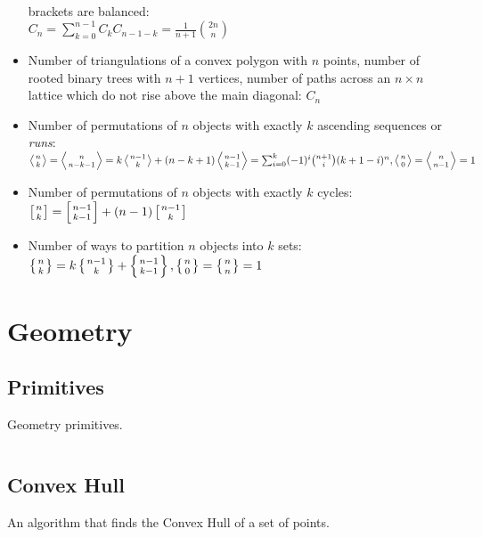 \documentclass[8pt,a4paper]{amsart}
\newcommand{\code}[1]{\inputminted[linenos]{cpp}{_code/#1}}
\begin{document}
\begin{itemize}
                brackets are balanced: \\ $C_n = \sum_{k=0}^{n-1} C_kC_{n-1-k}
                = \frac{1}{n+1}\binom{2n}n$
            \item Number of triangulations of a convex polygon with $n$ points,
                number of rooted binary trees with $n+1$ vertices, number of
                paths across an $n\times n$ lattice which do not rise above the
                main diagonal: $C_n$
            \item Number of permutations of $n$ objects with exactly $k$
                ascending sequences or {\it runs}: \\ $\left\langle {n \atop k}
                \right\rangle = \left\langle {n \atop n - k - 1} \right\rangle
                = k\left\langle {n - 1 \atop k} \right\rangle + (n - k +
                1)\left\langle {n-1 \atop k-1} \right\rangle =
                \sum_{i=0}^{k}(-1)^i \binom{n+1}{i} (k+1-i)^n, \left\langle {n
                \atop 0} \right\rangle = \left\langle {n \atop n -1}
                \right\rangle = 1$
            \item Number of permutations of $n$ objects with exactly $k$
                cycles: $\left[n \atop k\right] = \left[n-1 \atop k-1\right] +
                (n-1)\left[n-1 \atop k\right]$
            \item Number of ways to partition $n$ objects into $k$ sets:
                $\left\{n \atop k\right\} = k\left\{n-1 \atop k\right\} +
                \left\{n-1 \atop k-1\right\}, \left\{n\atop 0\right\} =
                \left\{n\atop n\right\} = 1$
        \end{itemize}


\section{Geometry}
    \subsection{Primitives}
        Geometry primitives.
        \code{geometry/primitives.cpp}

    \subsection{Convex Hull}
        An algorithm that finds the Convex Hull of a set of points.
        \code{geometry/convex_hull.cpp}
\end{document}

